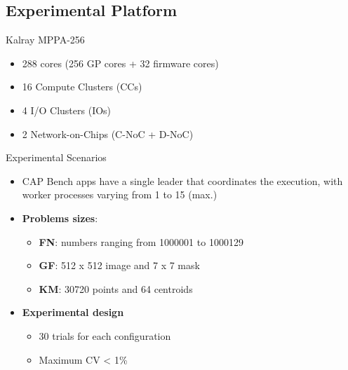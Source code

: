 \documentclass[english,aspectratio=169]{lapesd-slides}
\begin{document}
    \subsection{Experimental Platform}
      \begin{frame}{Kalray MPPA-256}
        \begin{itemize}
          \item 288 cores (256 GP cores + 32 firmware cores)
          \item 16 Compute Clusters (CCs)
          \item 4 I/O Clusters (IOs)
          \item 2 Network-on-Chips (C-NoC + D-NoC)
        \end{itemize}

      \end{frame}

      \begin{frame}{Experimental Scenarios}
        \begin{itemize}
          \item CAP Bench apps have a single leader that coordinates the execution, with
            worker processes varying from 1 to 15 (max.)

          \item \textbf{Problems sizes}:
          \begin{itemize}
            \item \textbf{FN}: numbers ranging from 1000001 to 1000129
            \item \textbf{GF}: 512 x 512 image and 7 x 7 mask
            \item \textbf{KM}: 30720 points and 64 centroids
          \end{itemize}

          \item \textbf{Experimental design}
          \begin{itemize}
            \item 30 trials for each configuration
            \item Maximum CV < 1\%
          \end{itemize}
        \end{itemize}
      \end{frame}
\end{document}
